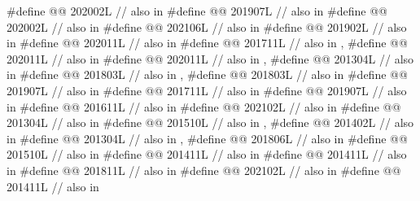 \begin{codeblock}
#define @@           202002L // also in 
#define @@                   201907L // also in 
#define @@                              202002L // also in 
#define @@                        202106L // also in 
#define @@                             201902L // also in 
#define @@                        202011L // also in 
#define @@                  201711L // also in , 
#define @@                       202011L // also in 
#define @@                   202011L // also in , 
#define @@                       201304L // also in 
#define @@                       201803L // also in , 
#define @@                           201803L // also in 
#define @@              201907L // also in 
#define @@                        201711L // also in 
#define @@                          201907L // also in 
#define @@                          201611L // also in 
#define @@                     202102L // also in 
#define @@      201304L // also in 
#define @@             201510L // also in , 
#define @@                   201402L // also in 
#define @@                    201304L // also in , 
#define @@                     201806L // also in 
#define @@     201510L // also in 
#define @@               201411L // also in 
#define @@         201411L // also in 
#define @@                        201811L // also in 
#define @@                           202102L // also in 
#define @@                            201411L // also in 
\end{codeblock}


